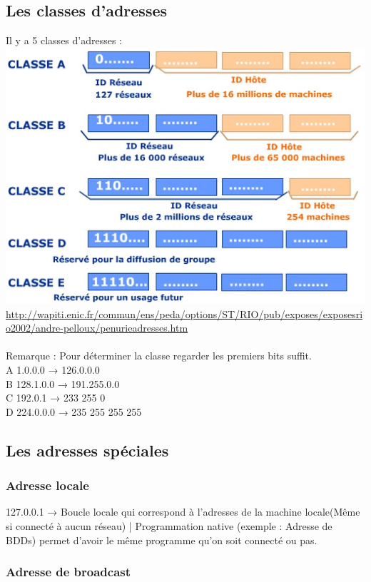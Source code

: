 \documentclass{article}
\begin{document}
\subsection{Les classes d'adresses}
Il y a 5 classes d’adresses : \\
\includegraphics{image/classesIP.jpg} \\
\url{http://wapiti.enic.fr/commun/ens/peda/options/ST/RIO/pub/exposes/exposesrio2002/andre-pelloux/penurieadresses.htm} \\
\\
Remarque : Pour déterminer la classe regarder les premiers bits suffit. \\
A 1.0.0.0 → 126.0.0.0 \\
B 128.1.0.0 → 191.255.0.0 \\
C 192.0.1 → 233 255 0 \\
D 224.0.0.0 → 235 255 255 255 \\

\newpage
\subsection{Les adresses spéciales}
\subsubsection{Adresse locale}
127.0.0.1 → Boucle locale qui correspond à l’adresses de la machine locale(Même si connecté à aucun réseau) | Programmation native (exemple : Adresse de BDDs) permet d’avoir le même programme qu’on soit connecté ou pas.
\subsubsection{Adresse de broadcast}
\end{document}
